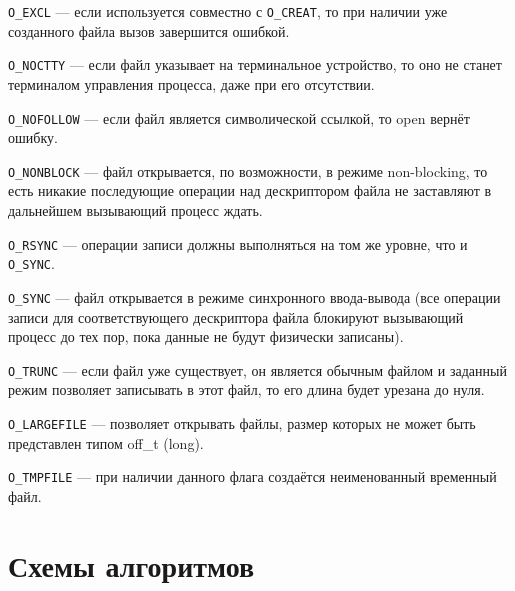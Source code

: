 \texttt{O\_EXCL} --- если используется совместно с \texttt{O\_CREAT}, то при наличии уже созданного файла вызов завершится ошибкой.

\texttt{O\_NOCTTY} --- если файл указывает на терминальное устройство, то оно не станет терминалом управления процесса, даже при его отсутствии.

\texttt{O\_NOFOLLOW} --- если файл является символической ссылкой, то open вернёт ошибку.

\texttt{O\_NONBLOCK} --- файл открывается, по возможности, в режиме non-blocking, то есть никакие последующие операции над дескриптором файла не заставляют в дальнейшем вызывающий процесс ждать.

\texttt{O\_RSYNC} --- операции записи должны выполняться на том же уровне, что и \texttt{O\_SYNC}.

\texttt{O\_SYNC} --- файл открывается в режиме синхронного ввода-вывода (все операции записи для соответствующего дескриптора файла блокируют вызывающий процесс до тех пор, пока данные не будут физически записаны).

\texttt{O\_TRUNC} --- если файл уже существует, он является обычным файлом и заданный режим позволяет записывать в этот файл, то его длина будет урезана до нуля.

\texttt{O\_LARGEFILE} --- позволяет открывать файлы, размер которых не может быть представлен типом off\_t (long).

\texttt{O\_TMPFILE} --- при наличии данного флага создаётся неименованный временный файл.

\chapter{Схемы алгоритмов}









